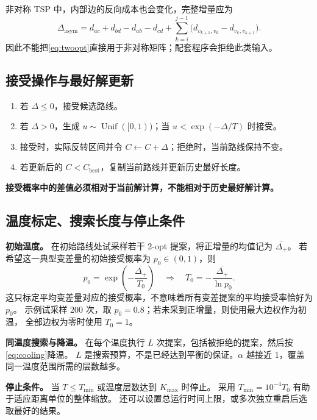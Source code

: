 \documentclass[UTF8,a4paper,11pt,fontset=none]{ctexart}
\numberwithin{equation}{section}
\newcommand{\best}{\mathrm{best}}
\DeclareMathOperator{\Unif}{Unif}
\begin{document}
非对称 TSP 中，内部边的反向成本也会变化，完整增量应为
\begin{equation}
  \Delta_{\mathrm{asym}}
  =d_{ac}+d_{bd}-d_{ab}-d_{cd}
   +\sum_{k=i}^{j-1}\bigl(d_{v_{k+1},v_k}-d_{v_k,v_{k+1}}\bigr).
\end{equation}
因此不能把\cref{eq:twoopt}直接用于非对称矩阵；配套程序会拒绝此类输入。

\subsection{接受操作与最好解更新}
\begin{enumerate}[label=\arabic*.]
  \item 若 $\Delta\leq0$，接受候选路线。
  \item 若 $\Delta>0$，生成 $u\sim\Unif([0,1))$；当 $u<\exp(-\Delta/T)$ 时接受。
  \item 接受时，实际反转区间并令 $C\gets C+\Delta$；拒绝时，当前路线保持不变。
  \item 若更新后的 $C<C_{\best}$，复制当前路线并更新历史最好长度。
\end{enumerate}
\textbf{接受概率中的差值必须相对于当前解计算，不能相对于历史最好解计算。}

\subsection{温度标定、搜索长度与停止条件}
\textbf{初始温度。}
在初始路线处试采样若干 2-opt 提案，将正增量的均值记为 $\overline{\Delta_+}$。
若希望这一典型变差量的初始接受概率为 $p_0\in(0,1)$，则
\begin{equation}
  p_0=\exp\!\left(-\frac{\overline{\Delta_+}}{T_0}\right)
  \quad\Longrightarrow\quad
  \boxed{T_0=-\frac{\overline{\Delta_+}}{\ln p_0}.}
  \label{eq:tzero}
\end{equation}
这只标定平均变差量对应的接受概率，不意味着所有变差提案的平均接受率恰好为 $p_0$。
示例试采样 200 次，取 $p_0=0.8$；若未采到正增量，则使用最大边权作为初温，
全部边权为零时使用 $T_0=1$。

\textbf{同温度搜索与降温。}
在每个温度执行 $L$ 次提案，包括被拒绝的提案，然后按\cref{eq:cooling}降温。
$L$ 是搜索预算，不是已经达到平衡的保证。$\alpha$ 越接近 1，覆盖同一温度范围所需的层数越多。

\textbf{停止条件。}
当 $T\leq T_{\min}$ 或温度层数达到 $K_{\max}$ 时停止。
采用 $T_{\min}=10^{-4}T_0$ 有助于适应距离单位的整体缩放。
还可以设置总运行时间上限，或多次独立重启后选取最好的结果。
\end{document}
